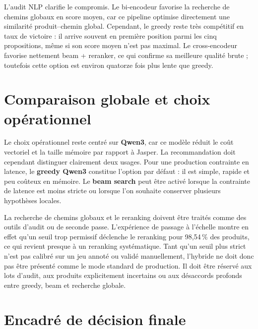 \documentclass[12pt,a4paper]{report}
\begin{document}
L'audit NLP clarifie le compromis. Le bi-encodeur favorise la recherche de chemins globaux en score moyen, car ce pipeline optimise directement une similarité produit--chemin global. Cependant, le greedy reste très compétitif en taux de victoire : il arrive souvent en première position parmi les cinq propositions, même si son score moyen n'est pas maximal. Le cross-encodeur favorise nettement beam + reranker, ce qui confirme sa meilleure qualité brute ; toutefois cette option est environ quatorze fois plus lente que greedy.

\section{Comparaison globale et choix opérationnel}
\label{sec:l2-l7-operational-choice}

Le choix opérationnel reste centré sur \textbf{Qwen3}, car ce modèle réduit le coût vectoriel et la taille mémoire par rapport à Jasper. La recommandation doit cependant distinguer clairement deux usages. Pour une production contrainte en latence, le \textbf{greedy Qwen3} constitue l'option par défaut : il est simple, rapide et peu coûteux en mémoire. Le \textbf{beam search} peut être activé lorsque la contrainte de latence est moins stricte ou lorsque l'on souhaite conserver plusieurs hypothèses locales.

La recherche de chemins globaux et le reranking doivent être traités comme des outils d'audit ou de seconde passe. L'expérience de passage à l'échelle montre en effet qu'un seuil trop permissif déclenche le reranking pour 98{,}54\,\% des produits, ce qui revient presque à un reranking systématique. Tant qu'un seuil plus strict n'est pas calibré sur un jeu annoté ou validé manuellement, l'hybride ne doit donc pas être présenté comme le mode standard de production. Il doit être réservé aux lots d'audit, aux produits explicitement incertains ou aux désaccords profonds entre greedy, beam et recherche globale.


\section{Encadré de décision finale}
\label{sec:decision-finale}
\end{document}
